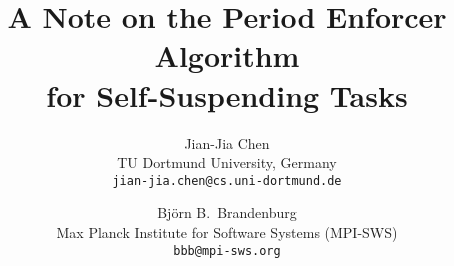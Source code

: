 



\title{A Note on the Period Enforcer Algorithm  \\ for Self-Suspending Tasks}

\date{}

\author{Jian-Jia Chen \\ TU Dortmund University, Germany \\ \texttt{jian-jia.chen@cs.uni-dortmund.de} \and Bj\"orn B.\ Brandenburg \\ Max Planck Institute for Software Systems (MPI-SWS) \\ \texttt{bbb@mpi-sws.org}}

%
%





\maketitle



%
%




{}



